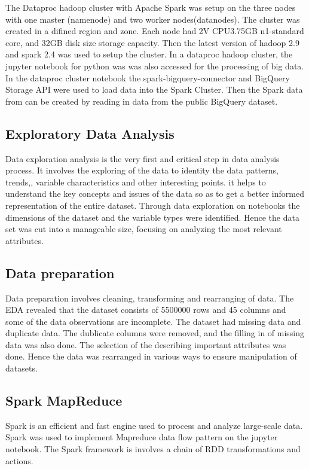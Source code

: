 \documentclass[12pt,letterpaper, twoside]{article}
\begin{document}
The Dataproc hadoop cluster with Apache Spark was setup on the three nodes with one master (namenode) and two worker nodes(datanodes). The cluster was created in a difined region and zone. Each node had 2V CPU3.75GB n1-standard core, and 32GB disk size storage capacity. Then the latest version of hadoop 2.9 and spark 2.4 was used to setup the cluster. In a dataproc hadoop cluster, the jupyter notebook for python was was also accessed for the processing of big data.  In the dataproc cluster notebook the spark-bigquery-connector and BigQuery Storage API were used to  load data into the Spark Cluster. Then the Spark data from can be created by reading in data from the public BigQuery dataset. 

\subsection{ Exploratory Data Analysis}
Data exploration analysis is the very first and critical step in data analysis process. It involves the exploring of the data to identity the data patterns, trends,, variable characteristics and other interesting points. it helps to understand the key concepts and issues of the data so as to get a better informed representation of the entire dataset. Through data exploration on notebooks the dimensions of the dataset and the variable types were identified. Hence the data set was cut into a manageable size, focusing on analyzing the most relevant attributes.  

\subsection{Data preparation}
Data preparation involves cleaning, transforming and rearranging of data. The EDA revealed that the dataset consists of 5500000 rows and 45 columns and some of the data observations are incomplete. The dataset had missing data and duplicate data. The dublicate columns were removed, and the filling in of missing data was also done. The selection of the describing important  attributes was done. Hence the data was rearranged in various ways to ensure  manipulation of datasets. 


\subsection{Spark MapReduce}
Spark is an efficient and fast engine used to process and analyze large-scale data. Spark was used to implement Mapreduce data flow pattern on the jupyter notebook. The Spark framework is involves a chain of RDD transformations and actions. 
\end{document}
